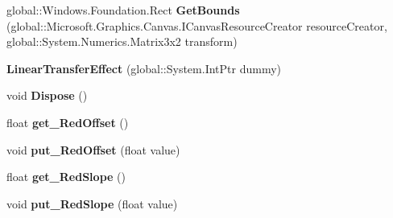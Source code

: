 \begin{DoxyCompactItemize}
global\+::\+Windows.\+Foundation.\+Rect {\bfseries Get\+Bounds} (global\+::\+Microsoft.\+Graphics.\+Canvas.\+I\+Canvas\+Resource\+Creator resource\+Creator, global\+::\+System.\+Numerics.\+Matrix3x2 transform)
\item 
\mbox{\label{class_microsoft_1_1_graphics_1_1_canvas_1_1_effects_1_1_linear_transfer_effect_ab618808a7f44e9188b529ade14052be5}} 
{\bfseries Linear\+Transfer\+Effect} (global\+::\+System.\+Int\+Ptr dummy)
\item 
\mbox{\label{class_microsoft_1_1_graphics_1_1_canvas_1_1_effects_1_1_linear_transfer_effect_a6b4b889a528c6743eee4a283fe67892a}} 
void {\bfseries Dispose} ()
\item 
\mbox{\label{class_microsoft_1_1_graphics_1_1_canvas_1_1_effects_1_1_linear_transfer_effect_ac7da84c5d5faac56ac8c6beb8c935d23}} 
float {\bfseries get\+\_\+\+Red\+Offset} ()
\item 
\mbox{\label{class_microsoft_1_1_graphics_1_1_canvas_1_1_effects_1_1_linear_transfer_effect_a6d4d761ad4b3ae015d3724f417618963}} 
void {\bfseries put\+\_\+\+Red\+Offset} (float value)
\item 
\mbox{\label{class_microsoft_1_1_graphics_1_1_canvas_1_1_effects_1_1_linear_transfer_effect_a6dc37edf11a2d5e95fababcfe4795a5f}} 
float {\bfseries get\+\_\+\+Red\+Slope} ()
\item 
\mbox{\label{class_microsoft_1_1_graphics_1_1_canvas_1_1_effects_1_1_linear_transfer_effect_a878367955d22fb27da4bafaf3fdf6e75}} 
void {\bfseries put\+\_\+\+Red\+Slope} (float value)
\item 
\mbox{\label{class_microsoft_1_1_graphics_1_1_canvas_1_1_effects_1_1_linear_transfer_effect_a370e7566173b4c585665201a2d663b25}} 

\end{DoxyCompactItemize}
